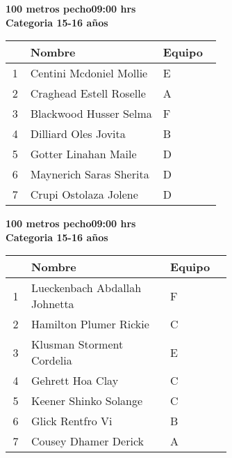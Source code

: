 \begin{minipage}{0.95\linewidth}\vspace{0.5cm} 
\begin{flushleft}
\textbf{
\hspace{-0.15cm}100 metros pecho\hspace{1.5cm}09:00 hrs \\Categoria 15-16 años}\vspace{-0.2cm} 
\end{flushleft}
\begin{tabular}{cp{0.63\linewidth}l}
\hline
& \textbf{Nombre} & \textbf{Equipo} \\ \hline
1 & Centini Mcdoniel Mollie & E \\ 
2 & Craghead Estell Roselle & A \\ 
3 & Blackwood Husser Selma & F \\ 
4 & Dilliard Oles Jovita & B \\ 
5 & Gotter Linahan Maile & D \\ 
6 & Maynerich Saras Sherita & D \\ 
7 & Crupi Ostolaza Jolene & D \\ 
\end{tabular}
\end{minipage}
\begin{minipage}{0.95\linewidth}\vspace{0.5cm} 
\begin{flushleft}
\textbf{
\hspace{-0.15cm}100 metros pecho\hspace{1.5cm}09:00 hrs \\Categoria 15-16 años}\vspace{-0.2cm} 
\end{flushleft}
\begin{tabular}{cp{0.63\linewidth}l}
\hline
& \textbf{Nombre} & \textbf{Equipo} \\ \hline
1 & Lueckenbach Abdallah Johnetta & F \\ 
2 & Hamilton Plumer Rickie & C \\ 
3 & Klusman Storment Cordelia & E \\ 
4 & Gehrett Hoa Clay & C \\ 
5 & Keener Shinko Solange & C \\ 
6 & Glick Rentfro Vi & B \\ 
7 & Cousey Dhamer Derick & A \\ 
\end{tabular}
\end{minipage}
